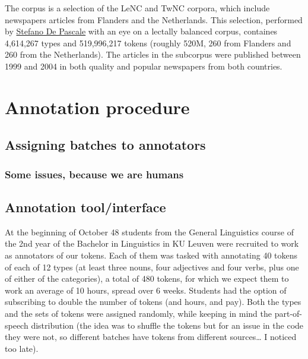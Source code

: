 \documentclass[
]{book}
\begin{document}
The corpus is a selection of the LeNC and TwNC corpora, which include newspapers articles from Flanders and the Netherlands. This selection, performed by \href{@de_pascale_token-based_2019}{Stefano De Pascale} with an eye on a lectally balanced corpus, containes 4,614,267 types and 519,996,217 tokens (roughly 520M, 260 from Flanders and 260 from the Netherlands). The articles in the subcorpus were published between 1999 and 2004 in both quality and popular newspapers from both countries.

\hypertarget{annotation}{%
\section{Annotation procedure}\label{annotation}}

\hypertarget{assigning-batches-to-annotators}{%
\subsection{Assigning batches to annotators}\label{assigning-batches-to-annotators}}

\hypertarget{some-issues-because-we-are-humans}{%
\subsubsection{Some issues, because we are humans}\label{some-issues-because-we-are-humans}}

\hypertarget{annotation-toolinterface}{%
\subsection{Annotation tool/interface}\label{annotation-toolinterface}}

At the beginning of October 48 students from the General Linguistics course of the 2nd year of the Bachelor in Linguistics in KU Leuven were recruited to work as annotators of our tokens. Each of them was tasked with annotating 40 tokens of each of 12 types (at least three nouns, four adjectives and four verbs, plus one of either of the categories), a total of 480 tokens, for which we expect them to work an average of 10 hours, spread over 6 weeks. Students had the option of subscribing to double the number of tokens (and hours, and pay). Both the types and the sets of tokens were assigned randomly, while keeping in mind the part-of-speech distribution (the idea was to shuffle the tokens but for an issue in the code they were not, so different batches have tokens from different sources\ldots{} I noticed too late).
\end{document}
